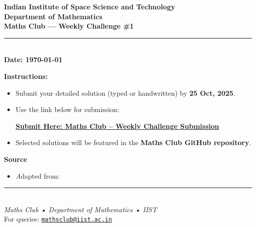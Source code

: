 \documentclass[12pt,a4paper]{article}
\newcommand{\challengenumber}{1}                %
\newcommand{\datefield}{\today}           %
\newcommand{\submissiondatefield}{25 Oct, 2025}           %
\newcommand{\submissionlink}{https://forms.gle/GLMsxBVwLkV5kedp7} %
\begin{document}
	
	\begin{center}
		\vspace*{0.2cm}
		{\large \textbf{Indian Institute of Space Science and Technology}}\\[2pt]
		{\normalsize \textbf{Department of Mathematics}}\\[8pt]
		{\LARGE \textbf{Maths Club — Weekly Challenge \#\challengenumber}}\\[6pt]
		\rule{0.9\textwidth}{0.4pt}\\[6pt]
		\textbf{Date: \datefield}
	\end{center}
	
	\vspace{0.8em}
	
	\begin{tcolorbox}[
		colback=gray!5,
		colframe=blue!70!black,
		title=\textbf{Challenge Question},
		fonttitle=\large\bfseries,
		boxrule=0.8pt,
		arc=3pt,
		left=6pt,
		right=6pt,
		top=6pt,
		bottom=6pt
		]
	\end{tcolorbox}
	
	\vspace{1em}
	\noindent\textbf{Instructions:}
	\begin{itemize}[left=1em]
		\item Submit your detailed solution (typed or handwritten) by \textbf{\submissiondatefield}.
		\item Use the link below for submission:
		\begin{center}
			\href{\submissionlink}{\textbf{Submit Here: Maths Club – Weekly Challenge Submission}}
		\end{center}
		\item Selected solutions will be featured in the \textbf{Maths Club GitHub repository}.
	\end{itemize}
	
	\vspace{1.5em}
	
	\noindent\textbf{Source}
	\begin{itemize}[left=1em]
		\item \textit Adapted from: %
	\end{itemize}
	
	
	
	\begin{center}
		\rule{0.9\textwidth}{0.4pt}\\[4pt]
		\textit{Maths Club • Department of Mathematics • IIST}\\
		\vspace{0.3cm}
		\small For queries: \href{mailto:mathsclub@iist.ac.in}{\texttt{mathsclub@iist.ac.in}}
	\end{center}
	
\end{document}
